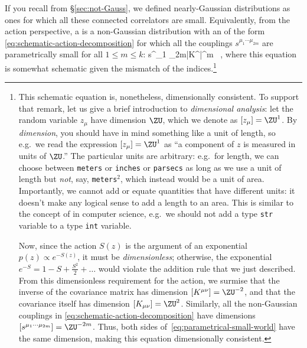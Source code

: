 If you recall from \S\ref{sec:not-Gauss}, we defined nearly-Gaussian distributions as ones for which all these connected correlators are small. Equivalently, from the action perspective, a  is a non-Gaussian distribution with an  of the form \eqref{eq:schematic-action-decomposition} for which all the couplings $s^{\mu_1 \cdots \mu_{2m}}$ are parametrically small for all $1 \leq m \leq k$:
\be\label{eq:parametrical-small-world}
\vert s^{\mu_1 \cdots \mu_{2m}}\vert \ll |K^{\mu\nu}|^{m} \, ,
\ee
where this equation is somewhat schematic given the mismatch of the indices.\footnote{
This schematic equation is, nonetheless, dimensionally consistent.\label{foot:dimensional-analysis} To support that remark, let us give a brief introduction to \emph{dimensional analysis}: let the random variable $z_\mu$ have dimension $\ZU$, which we denote as $[z_{\mu}]=\ZU^1$. By \emph{dimension}, you should have in mind something like a unit of length, so e.g.~we read the expression $[z_{\mu}]=\ZU^1$ as ``a component of $z$ is measured in units of $\ZU$.'' The particular units are arbitrary: e.g.~for length, we can choose between \texttt{meters} or \texttt{inches} or \texttt{parsecs} as long as we use a unit of length but \emph{not}, say, \texttt{meters}$^2$, which instead would be a unit of area. Importantly, we cannot add or equate quantities that have different units: it doesn't make any logical sense to add a length to an area. This is similar to the concept of  in computer science, e.g.~we should not add a type \texttt{str} variable to a type \texttt{int} variable.

Now, since the action $S(z)$ is the argument of an exponential $p(z) \propto e^{-S(z)}$, it must be \emph{dimensionless}; otherwise, the exponential $e^{-S}=1-S+\frac{S^2}{2}+\ldots$ would violate the addition rule that we just described. From this dimensionless requirement for the action, we surmise that the inverse of the covariance matrix has dimension $[K^{\mu\nu}]=\ZU^{-2}$, and that the covariance itself has dimension $[K_{\mu\nu}]=\ZU^{2}$. Similarly, all the non-Gaussian couplings in \eqref{eq:schematic-action-decomposition} have dimensions $[s^{\mu_1 \cdots \mu_{2m}}]=\ZU^{-2m}$. Thus, both sides of~\eqref{eq:parametrical-small-world} have the same dimension, making this equation dimensionally consistent.  

}
